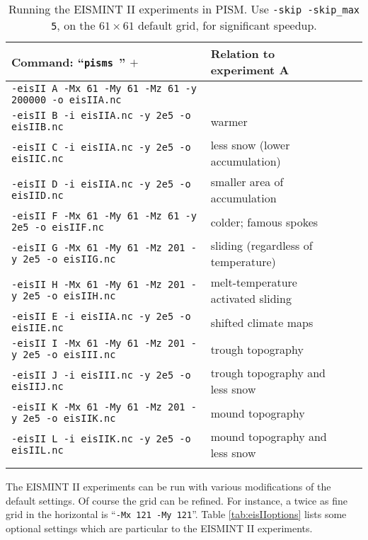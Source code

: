 \begin{table}[ht]
\centering
\small
\begin{tabular}{@{}llll}\toprule
\textbf{Command: ``\texttt{pisms }'' $+$} & \textbf{Relation to experiment A} \\
\midrule
\texttt{-eisII A -Mx 61 -My 61 -Mz 61 -y 200000 -o eisIIA.nc} & \\
\texttt{-eisII B -i eisIIA.nc -y 2e5 -o eisIIB.nc} & warmer \\
\texttt{-eisII C -i eisIIA.nc -y 2e5 -o eisIIC.nc} & less snow (lower accumulation)\\
\texttt{-eisII D -i eisIIA.nc -y 2e5 -o eisIID.nc} & smaller area of accumulation \\
\texttt{-eisII F -Mx 61 -My 61 -Mz 61 -y 2e5 -o eisIIF.nc} & colder; famous spokes \cite{BBL} \\
\texttt{-eisII G -Mx 61 -My 61 -Mz 201 -y 2e5 -o eisIIG.nc} & sliding (regardless of temperature) \\
\texttt{-eisII H -Mx 61 -My 61 -Mz 201 -y 2e5 -o eisIIH.nc} & melt-temperature activated sliding \\ \midrule
\texttt{-eisII E -i eisIIA.nc -y 2e5 -o eisIIE.nc} & shifted climate maps \\
\texttt{-eisII I -Mx 61 -My 61 -Mz 201 -y 2e5 -o eisIII.nc} & trough topography \\
\texttt{-eisII J -i eisIII.nc -y 2e5 -o eisIIJ.nc} & trough topography and less snow \\
\texttt{-eisII K -Mx 61 -My 61 -Mz 201 -y 2e5 -o eisIIK.nc} & mound topography \\
\texttt{-eisII L -i eisIIK.nc -y 2e5 -o eisIIL.nc} & mound topography and less snow \\
\bottomrule
\normalsize
\end{tabular}
\caption{Running the EISMINT II experiments in PISM.  Use \texttt{-skip -skip_max 5}, on the $61\times 61$ default grid, for significant speedup.}
\label{tab:eisII}
\end{table}

The EISMINT II experiments can be run with various modifications of the default settings.  Of course the grid can be refined.  For instance, a twice as fine grid in the horizontal is ``\texttt{-Mx 121 -My 121}''.  Table \ref{tab:eisIIoptions} lists some optional settings which are particular to the EISMINT II experiments.

